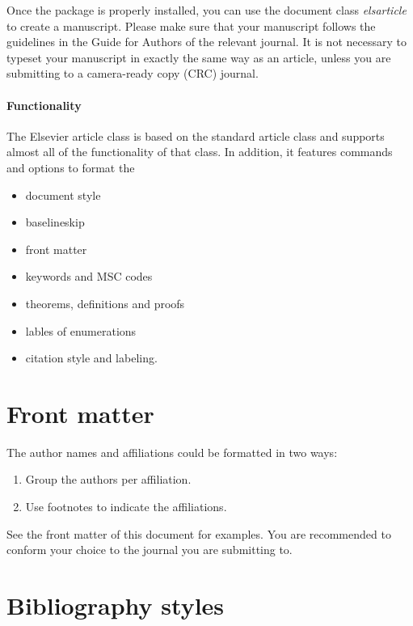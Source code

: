 \documentclass[]{elsarticle} %
\begin{document}
Once the package is properly installed, you can use the document class
\emph{elsarticle} to create a manuscript. Please make sure that your
manuscript follows the guidelines in the Guide for Authors of the
relevant journal. It is not necessary to typeset your manuscript in
exactly the same way as an article, unless you are submitting to a
camera-ready copy (CRC) journal.

\paragraph{Functionality}\label{functionality}

The Elsevier article class is based on the standard article class and
supports almost all of the functionality of that class. In addition, it
features commands and options to format the

\begin{itemize}
\item
  document style
\item
  baselineskip
\item
  front matter
\item
  keywords and MSC codes
\item
  theorems, definitions and proofs
\item
  lables of enumerations
\item
  citation style and labeling.
\end{itemize}

\section{Front matter}\label{front-matter}

The author names and affiliations could be formatted in two ways:

\begin{enumerate}
\def\labelenumi{(\arabic{enumi})}
\item
  Group the authors per affiliation.
\item
  Use footnotes to indicate the affiliations.
\end{enumerate}

See the front matter of this document for examples. You are recommended
to conform your choice to the journal you are submitting to.

\section{Bibliography styles}\label{bibliography-styles}
\end{document}
